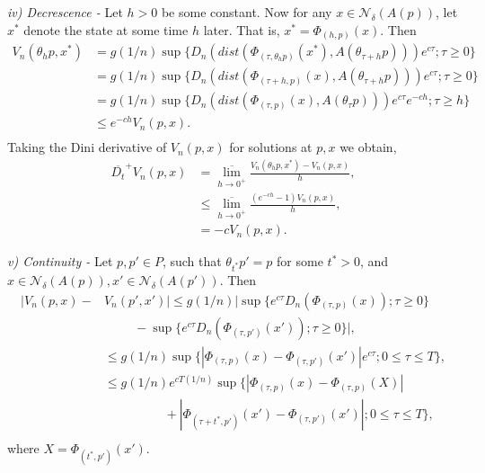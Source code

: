 \begin{prf}
  {\em iv) Decrescence -} Let $h > 0$ be some constant. Now for any
  $x \in \mathcal{N}_{\delta}(A(p))$, let $x^*$ denote the state at some time
  $h$ later. That is, $x^* = \Phi_{(h, p)}(x)$. Then
  \begin{align*}
  V_n( \theta_h p, x^* ) &= g(1/n) \sup \{ D_n(
  dist( \Phi_{(\tau, \theta_h p)}(x^*), A(\theta_{\tau+h} p) ) )
  e^{c \tau } ; \tau \geq 0 \} \\
  &= g(1/n) \sup \{ D_n(
  dist( \Phi_{(\tau + h, p)}(x), A(\theta_{\tau+h} p) ) )
  e^{c \tau } ; \tau \geq 0 \} \\
  &= g(1/n) \sup \{ D_n(
  dist( \Phi_{(\tau, p)}(x), A(\theta_{\tau} p) ) ) e^{c \tau }
  e^{-ch} ; \tau \geq h \} \\
  &\leq e^{-ch} V_n(p, x). \\
  \end{align*}
  Taking the Dini derivative of $V_n(p, x)$ for solutions at $p, x$ we obtain,
  \begin{align*}
  \overline{D_t}^+ V_n(p, x) &= \overline{\lim_{h \to 0^+}} \frac{V_n(
  \theta_h p, x^* ) - V_n(p, x)}{h}, \\
  &\leq \overline{\lim_{h \to 0^+}} \frac{(e^{-ch} - 1) V_n(p, x)}{h}, \\
  &= - c V_n(p, x).
  \end{align*}

  {\em v) Continuity -} Let $p, p' \in P$, such that $\theta_{t^*}p' = p$ for
  some $t^* > 0$, and $x \in \mathcal{N}_{\delta}(A(p)), x' \in
  \mathcal{N}_{\delta}(A(p'))$. Then
  \begin{align*}
  |V_n(p, x) - &V_n( p',x')| \leq g(1/n) | \sup \{
    e^{c\tau} D_n(\Phi_{(\tau, p)}(x)) ; \tau \geq 0 \}\\
  &\hspace{1cm}  - \sup \{
    e^{c\tau} D_n(\Phi_{(\tau, p')}(x')) ; \tau \geq 0 \} |, \\
  &\leq g(1/n) \sup \{ |\Phi_{(\tau, p)}(x) - \Phi_{(\tau,
    p')}(x')| e^{c\tau} ; 0 \leq \tau \leq T \}, \\
  &\leq g(1/n) e^{cT(1/n)} \sup \{ |\Phi_{(\tau, p)}(x) - \Phi_{(\tau,
    p)}(X)|  \\
  & \hspace{2cm} + |\Phi_{(\tau+t^*, p')}(x') - \Phi_{(\tau, p')}(x')| ; 0 \leq
    \tau \leq T \}, \\
  \end{align*}
  where $X = \Phi_{(t^*, p')}(x')$.


\end{prf}
